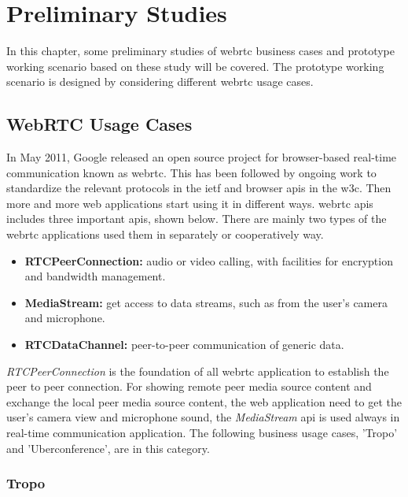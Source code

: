 \chapter{Preliminary Studies}
\label{chp:pre_study}

\noindent In this chapter, some preliminary studies of \gls{webrtc} business cases and prototype working scenario based on these study will be covered. The prototype working scenario is designed by considering different \gls{webrtc} usage cases.

\section{WebRTC Usage Cases}

\noindent In May 2011, Google released an open source project for browser-based real-time communication known as \gls{webrtc}. This has been followed by ongoing work to standardize the relevant protocols in the \gls{ietf} and browser \gls{api}s in the \gls{w3c}. Then more and more web applications start using it in different ways. \gls{webrtc} \gls{api}s includes three important \gls{api}s, shown below. There are mainly two types of the \gls{webrtc} applications used them in separately or cooperatively way.

\begin{itemize}[topsep=-1em,parsep=0em,itemsep=0em]
 \item \textbf{RTCPeerConnection:} audio or video calling, with facilities for encryption and bandwidth management.
  \item \textbf{MediaStream:} get access to data streams, such as from the user's camera and microphone.
 \item \textbf{RTCDataChannel:} peer-to-peer communication of generic data.
\end{itemize}

\par \textit{RTCPeerConnection} is the foundation of all \gls{webrtc} application to establish the peer to peer connection. For showing remote peer media source content and exchange the local peer media source content, the web application need to get the user's camera view and microphone sound, the \textit{MediaStream} \gls{api} is used always in real-time communication application. The following business usage cases, 'Tropo' and 'Uberconference', are in this category.

\subsection{Tropo}

